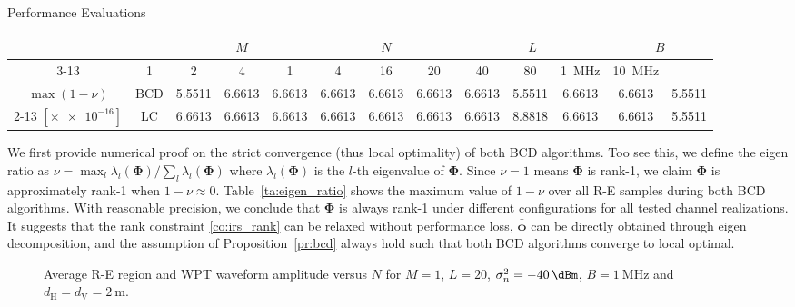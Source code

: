\documentclass[journal]{IEEEtran}
\begin{document}
\begin{section}{Performance Evaluations}
		\begin{table*}[!t]
			\caption{The maximum value of $1-\nu$ over all R-E samples during BCD and LC-BCD algorithms for all tested channel realizations}
			\label{ta:eigen_ratio}
			\centering
			\begin{tabular}{|c|c|c|c|c|c|c|c|c|c|c|c|c|}
			\hline
			\multicolumn{2}{|c|}{\multirow{2}{*}{}} & \multicolumn{3}{c|}{$M$} & \multicolumn{3}{c|}{$N$} & \multicolumn{3}{c|}{$L$} & \multicolumn{2}{c|}{$B$} \\ \cline{3-13}
			\multicolumn{2}{|c|}{} & \num{1} & \num{2} & \num{4} & \num{1} & \num{4} & \num{16} & \num{20} & \num{40} & \num{80} & \SI{1}{\MHz} & \SI{10}{\MHz} \\ \hline
			$\max(1 - \nu)$ & BCD & \num{5.5511} & \num{6.6613} & \num{6.6613} & \num{6.6613} & \num{6.6613} & \num{6.6613} & \num{6.6613} & \num{5.5511} & \num{6.6613} & \num{6.6613} & \num{5.5511} \\ \cline{2-13}
			$[\times \num{e-16}]$ & LC & \num{6.6613} & \num{6.6613} & \num{6.6613} & \num{6.6613} & \num{6.6613} & \num{6.6613} & \num{6.6613} & \num{8.8818} & \num{6.6613} & \num{6.6613} & \num{5.5511} \\ \hline
			\end{tabular}
		\end{table*}

		We first provide numerical proof on the strict convergence (thus local optimality) of both BCD algorithms. Too see this, we define the eigen ratio as $\nu=\max_l\lambda_l(\boldsymbol{\Phi})/\sum_l\lambda_l(\boldsymbol{\Phi})$ where $\lambda_l(\boldsymbol{\Phi})$ is the $l$-th eigenvalue of $\boldsymbol{\Phi}$. Since $\nu=1$ means $\boldsymbol{\Phi}$ is rank-\num{1}, we claim $\boldsymbol{\Phi}$ is approximately rank-\num{1} when $1-\nu \approx 0$. Table~\ref{ta:eigen_ratio} shows the maximum value of $1-\nu$ over all R-E samples during both BCD algorithms. With reasonable precision, we conclude that $\boldsymbol{\Phi}$ is always rank-\num{1} under different configurations for all tested channel realizations. It suggests that the rank constraint \ref{co:irs_rank} can be relaxed without performance loss, $\bar{\boldsymbol{\phi}}$ can be directly obtained through eigen decomposition, and the assumption of Proposition~\ref{pr:bcd} always hold such that both BCD algorithms converge to local optimal.

		\begin{figure}[!t]
			\centering
			\caption{Average R-E region and WPT waveform amplitude versus $N$ for $M=1$, $L=20$, $\sigma_n^2=\SI{-40}{\dBm}$, $B=\SI{1}{\MHz}$ and $d_{\mathrm{H}}=d_{\mathrm{V}}=\SI{2}{\meter}$.}
		\end{figure}


\end{section}
\end{document}
